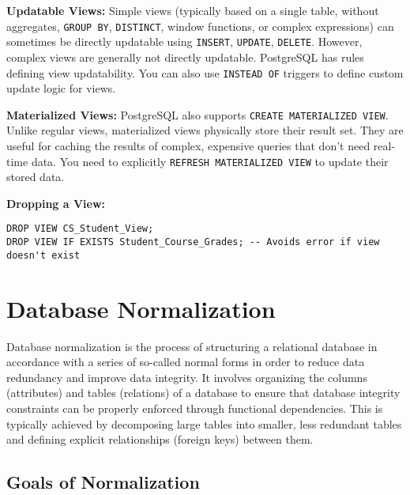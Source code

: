 \documentclass[12pt]{book}
\begin{document}
\textbf{Updatable Views:}
Simple views (typically based on a single table, without aggregates, \texttt{GROUP BY}, \texttt{DISTINCT}, window functions, or complex expressions) can sometimes be directly updatable using \texttt{INSERT}, \texttt{UPDATE}, \texttt{DELETE}. However, complex views are generally not directly updatable. PostgreSQL has rules defining view updatability. You can also use \texttt{INSTEAD OF} triggers to define custom update logic for views.

\textbf{Materialized Views:}
PostgreSQL also supports \texttt{CREATE MATERIALIZED VIEW}. Unlike regular views, materialized views physically store their result set. They are useful for caching the results of complex, expensive queries that don't need real-time data. You need to explicitly \texttt{REFRESH MATERIALIZED VIEW} to update their stored data.

\textbf{Dropping a View:}

\begin{lstlisting}[caption={Dropping a View}, label=lst:drop_view]
DROP VIEW CS_Student_View;
DROP VIEW IF EXISTS Student_Course_Grades; -- Avoids error if view doesn't exist
\end{lstlisting}

\chapter{Database Normalization}

Database normalization is the process of structuring a relational database in accordance with a series of so-called normal forms in order to reduce data redundancy and improve data integrity. It involves organizing the columns (attributes) and tables (relations) of a database to ensure that database integrity constraints can be properly enforced through functional dependencies. This is typically achieved by decomposing large tables into smaller, less redundant tables and defining explicit relationships (foreign keys) between them.

\section{Goals of Normalization}
\end{document}
